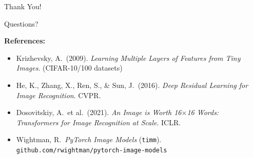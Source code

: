 \documentclass{beamer}
\begin{document}
\begin{frame}{Thank You!}

  \begin{center}
    \Large Questions?
  \end{center}

  \bigskip
  \textbf{References:}
  \begin{itemize}
    \item Krizhevsky, A.\ (2009). \textit{Learning Multiple Layers of Features from
          Tiny Images}. (CIFAR-10/100 datasets)
    \item He, K., Zhang, X., Ren, S., \& Sun, J.\ (2016).
          \textit{Deep Residual Learning for Image Recognition}. CVPR.
    \item Dosovitskiy, A.\ et al.\ (2021). \textit{An Image is Worth 16$\times$16
          Words: Transformers for Image Recognition at Scale}. ICLR.
    \item Wightman, R.\ \textit{PyTorch Image Models} (\texttt{timm}).
          \texttt{github.com/rwightman/pytorch-image-models}
  \end{itemize}

\end{frame}
\end{document}
